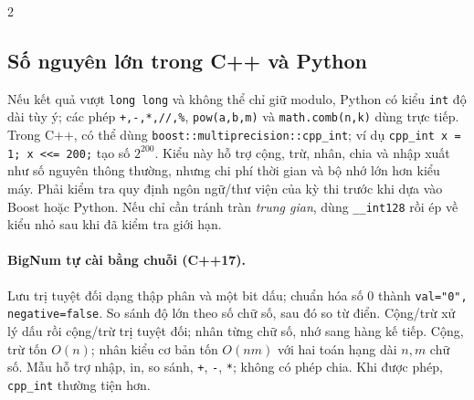 \begin{multicols}{2}
\subsection{Số nguyên lớn trong C++ và Python}
Nếu kết quả vượt \texttt{long long} và không thể chỉ giữ modulo,
Python có kiểu \texttt{int} độ dài tùy ý; các phép
\texttt{+,-,*,//,\%}, \texttt{pow(a,b,m)} và
\texttt{math.comb(n,k)} dùng trực tiếp.
Trong C++, có thể dùng
\texttt{boost::multiprecision::cpp\_int}; ví dụ
\texttt{cpp\_int x = 1; x <<= 200;} tạo số $2^{200}$.
Kiểu này hỗ trợ cộng, trừ,
nhân, chia và nhập xuất như số nguyên thông thường, nhưng chi
phí thời gian và bộ nhớ lớn hơn kiểu máy. Phải kiểm tra quy định
ngôn ngữ/thư viện của kỳ thi trước khi dựa vào Boost hoặc Python.
Nếu chỉ cần tránh tràn \emph{trung gian}, dùng
\texttt{\_\_int128} rồi ép về kiểu nhỏ sau khi đã kiểm tra giới hạn.

\paragraph{BigNum tự cài bằng chuỗi (C++17).}
Lưu trị tuyệt đối dạng thập phân và một bit dấu; chuẩn hóa số $0$
thành \texttt{val="0", negative=false}. So sánh độ lớn theo số chữ số,
sau đó so từ điển. Cộng/trừ xử lý dấu rồi cộng/trừ trị tuyệt đối;
nhân từng chữ số, nhớ sang hàng kế tiếp. Cộng, trừ tốn $O(n)$;
nhân kiểu cơ bản tốn $O(nm)$ với hai toán hạng dài $n,m$ chữ số.
Mẫu hỗ trợ nhập, in, so sánh, \texttt{+}, \texttt{-}, \texttt{*};
không có phép chia. Khi được phép, \texttt{cpp\_int} thường tiện hơn.
\end{multicols}
\endgroup
